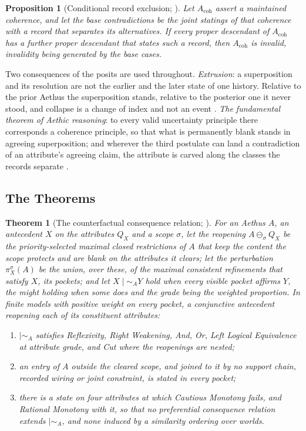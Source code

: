 \documentclass[11pt]{article}
\newtheorem{theorem}{Theorem}
\newtheorem{proposition}{Proposition}
\theoremstyle{definition}
\newcommand{\Aethus}{Aethus}
\begin{document}
\begin{proposition}[Conditional record exclusion; \cite{AethusRealist, AethusQuant}]\label{prop:core_record_exclusion}
Let $A_{\mathrm{coh}}$ assert a maintained coherence, and let the base contradictions be the joint statings of that coherence with a record that separates its alternatives. If every proper descendant of $A_{\mathrm{coh}}$ has a further proper descendant that states such a record, then $A_{\mathrm{coh}}$ is invalid, invalidity being generated by the base cases.
\end{proposition}

\noindent Two consequences of the posits are used throughout. \emph{Extrusion}: a superposition and its resolution are not the earlier and the later state of one history. Relative to the prior \Aethus{} the superposition stands, relative to the posterior one it never stood, and collapse is a change of index and not an event \cite{Aethus}. \emph{The fundamental theorem of Aethic reasoning}: to every valid uncertainty principle there corresponds a coherence principle, so that what is permanently blank stands in agreeing superposition; and wherever the third postulate can land a contradiction of an attribute's agreeing claim, the attribute is carved along the classes the records separate \cite{Aethus}.

\subsection{The Theorems}\label{sec:core_theorems}

\begin{theorem}[The counterfactual consequence relation; \cite{AethusSemantics}]\label{thm:core_cf}
For an \Aethus{} $A$, an antecedent $X$ on the attributes $Q_X$ and a scope $\sigma$, let the \emph{reopening} $A \ominus_\sigma Q_X$ be the priority-selected maximal closed restrictions of $A$ that keep the content the scope protects and are blank on the attributes it clears; let the \emph{perturbation} $\pi^{\sigma}_X(A)$ be the union, over these, of the maximal consistent refinements that satisfy $X$, its \emph{pockets}; and let $X \mid\sim_A Y$ hold when every visible pocket affirms $Y$, the \emph{might} holding when some does and the grade being the weighted proportion. In finite models with positive weight on every pocket, a conjunctive antecedent reopening each of its constituent attributes:
\begin{enumerate}
\item[(i)] $\mid\sim_A$ satisfies Reflexivity, Right Weakening, And, Or, Left Logical Equivalence at attribute grade, and Cut where the reopenings are nested;
\item[(ii)] an entry of $A$ outside the cleared scope, and joined to it by no support chain, recorded wiring or joint constraint, is stated in every pocket;
\item[(iii)] there is a state on four attributes at which Cautious Monotony fails, and Rational Monotony with it, so that no preferential consequence relation extends $\mid\sim_A$, and none induced by a similarity ordering over worlds.
\end{enumerate}
\end{theorem}
\end{document}
